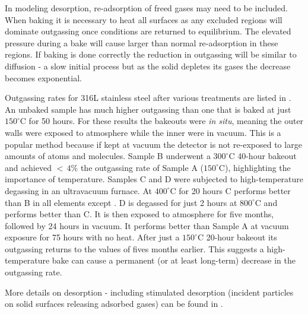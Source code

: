 In modeling desorption, re-adsorption of freed gases may need to be included.  When baking it is necessary to heat all surfaces as
any excluded regions will dominate outgassing once conditions are returned to equilibrium.  The elevated pressure during a bake will
cause larger than normal re-adsorption in these regions.  If baking is done correctly the reduction in
outgassing will be similar to diffusion - a slow initial process but as the solid depletes its gases the decrease becomes
exponential.

Outgassing rates for 316L stainless steel after various treatments are listed in
 .  An unbaked sample has
much higher outgassing than one that is baked at just $150^{\circ}\mathrm{C}$ for 50 hours.  For these results the bakeouts were
\textit{in situ}, meaning the outer walls were exposed to atmosphere while the inner were in vacuum.  This is a popular method because
if kept at vacuum the detector is not re-exposed to large amounts of atoms and molecules.  Sample B underwent a $300^{\circ}\mathrm{C}$
40-hour bakeout and achieved ${<}\, 4\%$ the  outgassing rate of Sample A ($150^{\circ}\mathrm{C}$), highlighting the importance
of temperature.  Samples C and D
were subjected to high-temperature degassing in an ultravacuum furnace.  At $400^{\circ}\mathrm{C}$ for 20 hours C performs better than B
in all elements except .  D is degassed for just 2 hours at $800^{\circ}\mathrm{C}$ and performs better than C.  It is then
exposed to atmosphere for five months, followed by 24 hours in vacuum.  It performs better than Sample A at vacuum exposure for 75 hours
with no heat.  After just a $150^{\circ}\mathrm{C}$ 20-hour bakeout its outgassing returns to the values of fives months
earlier.  This suggests a high-temperature bake can cause a permanent (or at least long-term) decrease in the outgassing rate.

More details on desorption - including stimulated desorption (incident particles on solid surfaces releasing adsorbed gases) can be
found in .



